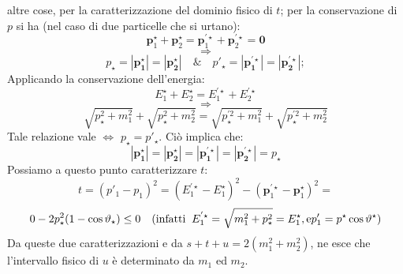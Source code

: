 altre cose, per la caratterizzazione del dominio fisico di $t$;
per la conservazione di $p$ si ha (nel caso di due particelle che
si urtano):
$$
\mathbf{p}_1^{\star} + \mathbf{p}_2^{\star}=\mathbf{p}_1^{'\star}
+ \mathbf{p}_2^{'\star}=\mathbf{0}
$$
$$
\Longrightarrow
$$
$$
p_{\star}=|\mathbf{p_{1}^{\star}}|=|\mathbf{p_{2}^{\star}}| \quad
\& \quad
p'_{\star}=|\mathbf{p_{1}^{'\star}}|=|\mathbf{p_{2}^{'\star}}|;
$$
Applicando la conservazione dell'energia:
$$
E_1^{\star} + E_2^{\star} = E_1^{'\star} + E_2^{'\star}
$$
$$
\Longrightarrow
$$
$$
\sqrt{p_{\star}^2 + m_1^2} + \sqrt{p_{\star}^2 +
  m_2^2} = \sqrt{p_{\star}^{'2} + m_1^2} + \sqrt{p_{\star}^{'2} +
  m_2^2}
$$
Tale relazione vale $\Leftrightarrow$ $p_{\star}=p'_{\star}$.
Ci\`o implica che:
$$
|\mathbf{p_{1}^{\star}}| = |\mathbf{p_{2}^{\star}}| =
|\mathbf{p_{1}^{'\star}}| = |\mathbf{p_{2}^{'\star}}| = p_{\star}
$$
Possiamo a questo punto caratterizzare $t$:
$$
t = (p'_1-p_1)^2 = (E_1^{'\star} - E_1^{\star})^2 -
(\mathbf{p}_1^{'\star} - \mathbf{p}_1^{\star})^2 =
$$
$$
0 - 2 p_{\star}^2(1 - \cos \vartheta_{\star}) \leq 0 \quad
(\mathrm{infatti }\;\; E_1^{'\star} = \sqrt{m_1^2 +
p_{\star}^2}=E_1^{\star}, \mathrm{ e }
p'_1=p^{\star}\cos\vartheta^{\star})
$$
Da queste due caratterizzazioni e da $ s + t + u = 2 (m_1^2 +
m_2^2)$, ne esce che l'intervallo fisico di $u$ \`e determinato da
$m_1$ ed $m_2$.
